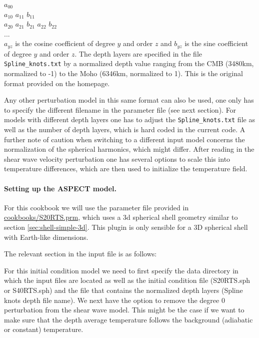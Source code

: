 \documentclass{article}
\newcommand{\aspect}{\textsc{ASPECT}}
\begin{document}
\noindent $a_{00}$ \\
$a_{10}$ $a_{11}$ $b_{11}$ \\
$a_{20}$ $a_{21}$ $b_{21}$ $a_{22}$ $b_{22}$ \\
... \\

$a_{yz}$ is the cosine coefficient of degree $y$ and order $z$ and $b_{yz}$ is 
the sine coefficient of degree $y$ and order $z$. The depth layers are specified 
in the file \texttt{Spline\_knots.txt} by a normalized depth value ranging from the CMB (3480km, 
normalized to -1) to the Moho (6346km, normalized to 1). This is the original
format provided on the homepage. 

Any other perturbation model in this same format can also be used, one only
has to specify the different filename in the parameter file (see next section).
For models with different depth layers one has to adjust the \texttt{Spline\_knots.txt} 
file as well as the number of depth layers, which is hard coded in the current 
code. A further note of caution when switching to a different input model 
concerns the normalization of the spherical harmonics, which might differ.  
After reading in the shear wave velocity perturbation one has several options
to scale this into temperature differences, which are then used to initialize 
the temperature field. 

\paragraph{Setting up the \aspect{} model.}

For this cookbook we will use the parameter file provided in 
\url{cookbooks/S20RTS.prm}, which uses a 3d spherical shell 
geometry similar to section \ref{sec:shell-simple-3d}. This plugin is only sensible 
for a 3D spherical shell with Earth-like dimensions. 

The relevant section in the input file is as follows:



For this initial condition model we need to first specify the data directory in which 
the input files are located as well as the initial condition file (S20RTS.sph or 
S40RTS.sph) and the file that contains the normalized depth layers (Spline knots depth file name). 
We next have the option to remove the degree 0 perturbation from the shear 
wave model. This might be the case if we want to make sure that the depth 
average temperature follows the background (adiabatic or constant) temperature.  
\end{document}
